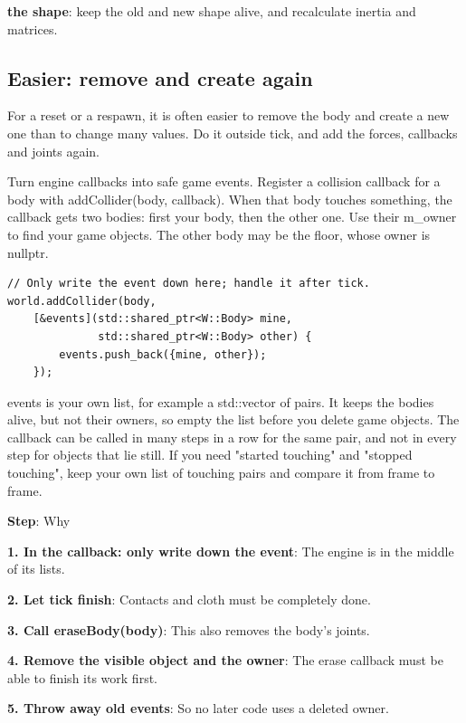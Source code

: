 \documentclass[11pt,a4paper]{article}
\begin{document}
\textbf{the shape}: keep the old and new shape alive, and recalculate inertia and matrices.

\subsection*{Easier: remove and create again}
For a reset or a respawn, it is often easier to remove the body and create a new one than to change many values. Do it outside tick, and add the forces, callbacks and joints again.

\label{vpe-core-25}
Turn engine callbacks into safe game events. Register a collision callback for a body with addCollider(body, callback). When that body touches something, the callback gets two bodies: first your body, then the other one. Use their m\_owner to find your game objects. The other body may be the floor, whose owner is nullptr.

\begin{lstlisting}
// Only write the event down here; handle it after tick.
world.addCollider(body,
    [&events](std::shared_ptr<W::Body> mine,
              std::shared_ptr<W::Body> other) {
        events.push_back({mine, other});
    });
\end{lstlisting}

events is your own list, for example a std::vector of pairs. It keeps the bodies alive, but not their owners, so empty the list before you delete game objects. The callback can be called in many steps in a row for the same pair, and not in every step for objects that lie still. If you need "started touching" and "stopped touching", keep your own list of touching pairs and compare it from frame to frame.

\textbf{Step}: Why

\textbf{1. In the callback: only write down the event}: The engine is in the middle of its lists.

\textbf{2. Let tick finish}: Contacts and cloth must be completely done.

\textbf{3. Call eraseBody(body)}: This also removes the body's joints.

\textbf{4. Remove the visible object and the owner}: The erase callback must be able to finish its work first.

\textbf{5. Throw away old events}: So no later code uses a deleted owner.
\end{document}
